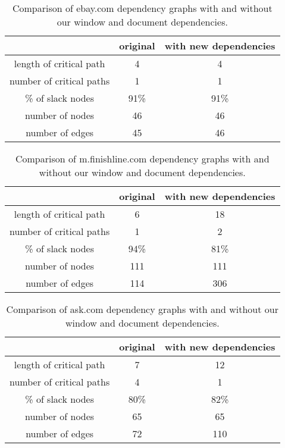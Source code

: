 \begin{table*}[tb]
\centering
\small
\begin{tabular}{|c|c|c|}
\hline
 & original & with new dependencies \\
\hline
length of critical path & 4 & 4 \\
number of critical paths & 1 & 1 \\
\% of slack nodes & 91\% & 91\% \\
number of nodes & 46 & 46 \\
number of edges & 45 & 46 \\
\hline
\end{tabular}\caption{Comparison of ebay.com dependency graphs with and without our window and document dependencies.}
\label{t:ebaygraph}
\end{table*}

\begin{table*}[tb]
\centering
\small
\begin{tabular}{|c|c|c|}
\hline
 & original & with new dependencies \\
\hline
length of critical path & 6 & 18 \\
number of critical paths & 1 & 2 \\
\% of slack nodes & 94\% & 81\% \\
number of nodes & 111 & 111 \\
number of edges & 114 & 306 \\
\hline
\end{tabular}\caption{Comparison of m.finishline.com dependency graphs with and without our window and document dependencies.}
\label{t:finishlinegraph}
\end{table*}


\begin{table*}[tb]
\centering
\small
\begin{tabular}{|c|c|c|}
\hline
 & original & with new dependencies \\
\hline
length of critical path & 7 & 12 \\
number of critical paths & 4 & 1 \\
\% of slack nodes & 80\% & 82\% \\
number of nodes & 65 & 65 \\
number of edges & 72 & 110 \\
\hline
\end{tabular}\caption{Comparison of ask.com dependency graphs with and without our window and document dependencies.}
\label{t:askgraph}
\end{table*}

